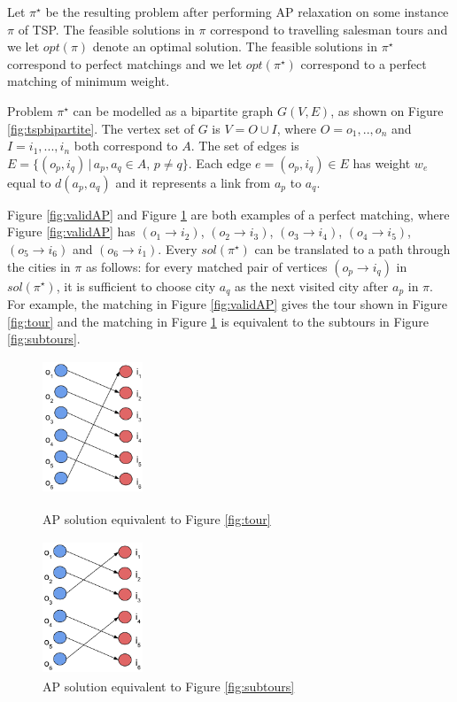 \documentclass{mprop}
\theoremstyle{definition}
\begin{document}
Let $\pi^{\star}$ be the resulting problem after performing AP relaxation on some instance $\pi$ of TSP. 
The feasible solutions in $\pi$ correspond to travelling salesman tours and we let $opt(\pi)$ denote an optimal solution. The feasible solutions in $\pi^{\star}$ correspond to perfect matchings and we let $opt(\pi^{\star})$ correspond to a perfect matching of minimum weight.

Problem $\pi^{\star}$ can be modelled as a bipartite graph $G(V,E)$, as shown on Figure \ref{fig:tspbipartite}. The vertex set of $G$ is $V=O \cup I$, where $O = o_{1},..,o_{n}$ and $I = i_{1},...,i_{n}$ both correspond to $A$. The set of edges is $E = \{(o_{p}, i_{q}) \,|\, a_{p},a_{q} \in A,\, p \neq q \}$. Each edge $e = (o_{p}, i_{q}) \in E$ has weight $w_{e}$ equal to $d(a_{p},a_{q})$ and it represents a link from $a_{p}$ to $a_{q}$.

Figure \ref{fig:validAP} and Figure \ref{fig:invalidAP} are both examples of a perfect matching, where Figure \ref{fig:validAP} has $(o_{1} \rightarrow i_{2})$, $(o_{2} \rightarrow i_{3})$, $(o_{3} \rightarrow i_{4})$, $(o_{4} \rightarrow i_{5})$, $(o_{5} \rightarrow i_{6})$ and $(o_{6} \rightarrow i_{1})$.
Every $sol(\pi^{\star})$ can be translated to a path through the cities in $\pi$ as follows: for every matched pair of vertices $(o_{p} \rightarrow i_{q})$ in $sol(\pi^{\star})$, it is sufficient to choose city $a_{q}$ as the next visited city after $a_{p}$ in $\pi$. For example, the matching in Figure \ref{fig:validAP} gives the tour shown in Figure \ref{fig:tour} and the matching in Figure \ref{fig:invalidAP} is equivalent to the subtours in Figure \ref{fig:subtours}.

\begin{figure}
\centering
\begin{minipage}{.5\textwidth}
\centering
 \includegraphics[width=3cm, height=4cm]{images/validAP.png}
 \caption{AP solution equivalent to Figure \ref{fig:tour}}
 \label{fig:validAP}
\end{minipage}%
\begin{minipage}{.5\textwidth}
\centering
 \includegraphics[width=3cm, height=4cm]{images/invalidAP.png}
 \caption{AP solution equivalent to Figure \ref{fig:subtours}}
 \label{fig:invalidAP}
\end{minipage}
\end{figure}
\end{document}
